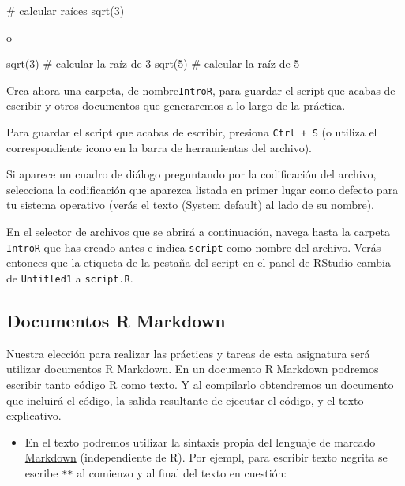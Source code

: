 \documentclass[
  title=normal,
  notoc,
  bib=normal]{mnye}
\newenvironment{Shaded}{\begin{snugshade}}{\end{snugshade}}
\newcommand{\FunctionTok}[1]{\textcolor[rgb]{0.00,0.00,0.00}{#1}}
\newcommand{\NormalTok}[1]{#1}
\providecommand{\tightlist}{%
  \setlength{\itemsep}{0pt}\setlength{\parskip}{0pt}}
\begin{document}
\begin{Shaded}
\begin{Highlighting}[]
\FunctionTok{\# calcular raíces }
\NormalTok{sqrt(3)}
\end{Highlighting}
\end{Shaded}

o

\begin{Shaded}
\begin{Highlighting}[]
\NormalTok{sqrt(3) \# calcular la raíz de 3}
\NormalTok{sqrt(5) \# calcular la raíz de 5}
\end{Highlighting}
\end{Shaded}

Crea ahora una carpeta, de nombre\texttt{IntroR}, para guardar el script que acabas de escribir y otros documentos que generaremos a lo largo de la práctica.

Para guardar el script que acabas de escribir, presiona \texttt{Ctrl\ +\ S} (o utiliza el correspondiente icono en la barra de herramientas del archivo).

Si aparece un cuadro de diálogo preguntando por la codificación del archivo, selecciona la codificación que aparezca listada en primer lugar como defecto para tu sistema operativo (verás el texto (System default) al lado de su nombre).

En el selector de archivos que se abrirá a continuación, navega hasta la carpeta \texttt{IntroR} que has creado antes e indica \texttt{script} como nombre del archivo. Verás entonces que la etiqueta de la pestaña del script en el panel de RStudio cambia de \texttt{Untitled1} a \texttt{script.R}.

\hypertarget{documentos-r-markdown}{%
\subsection{Documentos R Markdown}\label{documentos-r-markdown}}

Nuestra elección para realizar las prácticas y tareas de esta asignatura será utilizar documentos R Markdown. En un documento R Markdown podremos escribir tanto código \textsf{R} como texto. Y al compilarlo obtendremos un documento que incluirá el código, la salida resultante de ejecutar el código, y el texto explicativo.

\begin{itemize}
\tightlist
\item
  En el texto podremos utilizar la sintaxis propia del lenguaje de marcado \href{https://es.wikipedia.org/wiki/Markdown}{Markdown} (independiente de \textsf{R}). Por ejempl, para escribir texto negrita se escribe \texttt{**} al comienzo y al final del texto en cuestión:
\end{itemize}
\end{document}

